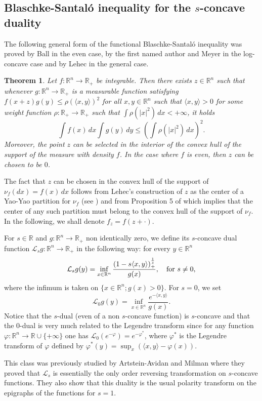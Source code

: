 \documentclass[10pt]{amsart}
\newtheorem{thm}{Theorem}[section]
\theoremstyle{definition}
\theoremstyle{remark}
\newcommand{\R}{\mathbb{R}}
\renewcommand{\L}{\mathcal{L}}
\begin{document}
\subsection{Blaschke-Santal\'o inequality for the $s$-concave duality}
The following general form of the functional Blaschke-Santal\'o inequality was proved by Ball \cite{ball86} in the even case, by the first named author and Meyer \cite{fm07} in the log-concave case and by Lehec \cite{Lehec1} in the general case. 
\begin{thm}\label{thm:Lehec}
Let $f: \R^n \to \R_+$ be integrable. Then there exists $z \in \R^n$ such that whenever $g:\R^n \to \R_+$ is a measurable function satisfying $f(x+z)g(y) \leq \rho(\langle x,y \rangle)^2$ for all $x,y\in \R^n$ such that $\langle x,y \rangle >0$ for some weight function $\rho : \R_+ \to \R_+$ such that $\int \rho(|x|^2)\,dx<+\infty$, it holds 
\[
\int f(x)\,dx \int g(y)\,dy \leq \left(\int \rho(|x|^2)\,dx\right)^2.
\]
Moreover, the point $z$ can be selected in the interior of the convex hull of the support of the measure with density $f$. In the case where $f$ is even, then $z$ can be chosen to be $0$.
\end{thm}
The fact that $z$ can be chosen in the convex hull of the support of $\nu_f(dx) = f(x)\,dx$ follows from Lehec's construction of $z$ as the center of a Yao-Yao partition for $\nu_f$ (see \cite[Theorem 9]{Lehec1}) and from Proposition 5 of \cite{Lehec2} which implies that the center of any such partition must belong to the convex hull of the support of $\nu_f$. In the following, we shall denote $f_z=f(z+\cdot).$


For $s\in\R$ and $g:\R^n\to\R_+$ non identically zero, we define its $s$-concave dual function $\L_s g:\R^n\to\R_+$ in the following way: for every $y\in\R^n$ 
\[
\L_s g(y)=\inf_{x\in\R^n}\frac{\left(1-s\langle x,y\rangle\right)_+^\frac{1}{s}}{g(x)},\quad \hbox{for $s\neq 0$,}
\]
where the infimum is taken on $\{x\in\R^n; g(x)>0\}$. For $s=0$, we set 
\[
\L_0 g(y)=\inf_{x\in\R^n}\frac{e^{-\langle x,y\rangle}}{g(x)}.
\]
Notice that the $s$-dual (even of a non $s$-concave function) is $s$-concave and that the $0$-dual is very much related to the Legendre transform since for any function $\varphi:\R^n\to\R\cup\{+\infty\}$ one has $\L_0(e^{-\varphi})=e^{-\varphi^*}$, where $\varphi^*$ is the Legendre transform of $\varphi$ defined by $\varphi^*(y)=\sup_x(\langle x,y\rangle-\varphi(x))$. 

This class was previously studied by Artstein-Avidan and Milman \cite{AAM08} where they proved that $\L_s$ is essentially the only order reversing transformation on $s$-concave functions. They also show that this duality is the usual polarity transform on the epigraphs of the functions for $s=1$.
\end{document}
